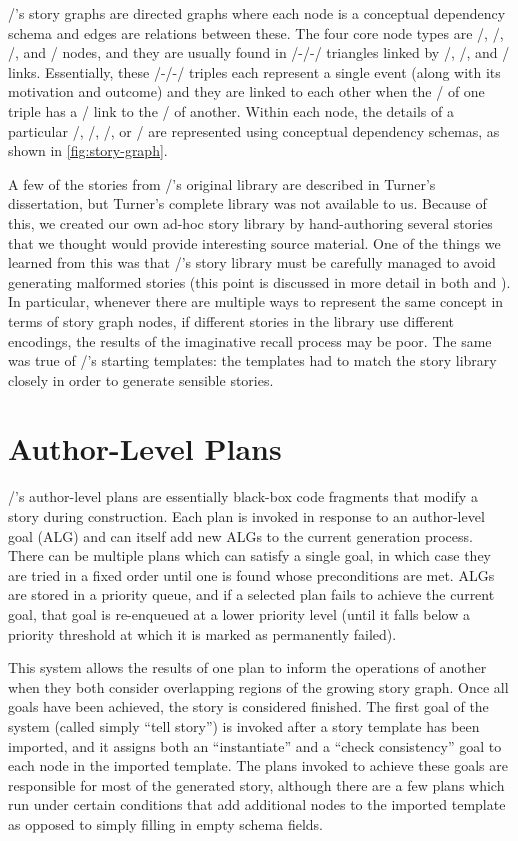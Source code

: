 \minstrel/'s story graphs are directed graphs where each node is a conceptual dependency schema and edges are relations between these.
%
The four core node types are \gng/, \gna/, \gns/, and \gnb/ nodes, and they are usually found in \gng/-\gna/-\gns/ triangles linked by \gep/, \gei/, and \gea/ links.
%
Essentially, these \gng/-\gna/-\gns/ triples each represent a single event (along with its motivation and outcome) and they are linked to each other when the \gns/ of one triple has a \gem/ link to the \gng/ of another.
%
Within each node, the details of a particular \gng/, \gna/, \gns/, or \gnb/ are represented using conceptual dependency schemas, as shown in \cref{fig:story-graph}.


A few of the stories from \minstrel/'s original library are described in Turner's dissertation, but Turner's complete library was not available to us.
%
Because of this, we created our own ad-hoc story library by hand-authoring several stories that we thought would provide interesting source material.
%
One of the things we learned from this was that \minstrel/'s story library must be carefully managed to avoid generating malformed stories (this point is discussed in more detail in both \citep{Tearse2012} and \citep{Tearse2014}).
%
In particular, whenever there are multiple ways to represent the same concept in terms of story graph nodes, if different stories in the library use different encodings, the results of the imaginative recall process may be poor.
%
The same was true of \minstrel/'s starting templates: the templates had to match the story library closely in order to generate sensible stories.


\section{Author-Level Plans}

\minstrel/'s author-level plans are essentially black-box code fragments that modify a story during construction.
%
Each plan is invoked in response to an author-level goal (ALG) and can itself add new ALGs to the current generation process.
%
There can be multiple plans which can satisfy a single goal, in which case they are tried in a fixed order until one is found whose preconditions are met.
%
ALGs are stored in a priority queue, and if a selected plan fails to achieve the current goal, that goal is re-enqueued at a lower priority level (until it falls below a priority threshold at which it is marked as permanently failed).


This system allows the results of one plan to inform the operations of another when they both consider overlapping regions of the growing story graph.
%
Once all goals have been achieved, the story is considered finished.
%
The first goal of the system (called simply ``tell story'') is invoked after a story template has been imported, and it assigns both an ``instantiate'' and a ``check consistency'' goal to each node in the imported template.
%
The plans invoked to achieve these goals are responsible for most of the generated story, although there are a few plans which run under certain conditions that add additional nodes to the imported template as opposed to simply filling in empty schema fields.


